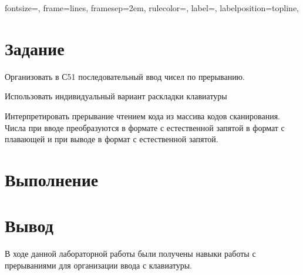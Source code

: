 

\def \labnum {5}
\def \labsubj {Организация ЭВМ и систем}
\def \labauthor {Айтуганов Д. А. \\ Чебыкин И. Б.}
\def \labgroup {P3301}
\def \labinsp {Скорубский В. И.}
\def \labname {}

\isnametrue
\lstset{
	caption=\lstname,
	basicstyle=\ttfamily\selectfont\scriptsize
}

\usepackage[dvipsnames]{xcolor}
\usepackage{fancyvrb}

 {
 fontsize=\scriptsize,
 frame=lines,  %
 framesep=2em, %
 rulecolor=\color{Gray},
 label=,
 labelposition=topline,
}


\section{Задание}
Организовать в С51 последовательный ввод чисел по прерыванию.

Использовать индивидуальный вариант раскладки клавиатуры

Интерпретировать прерывание чтением кода из массива кодов сканирования.
Числа при вводе преобразуются в формате с естественной запятой в формат с
плавающей и при выводе в формат с естественной запятой.
\section{Выполнение}
\section{Вывод}
В ходе данной лабораторной работы были получены навыки работы с прерываниями
для организации ввода с клавиатуры.

